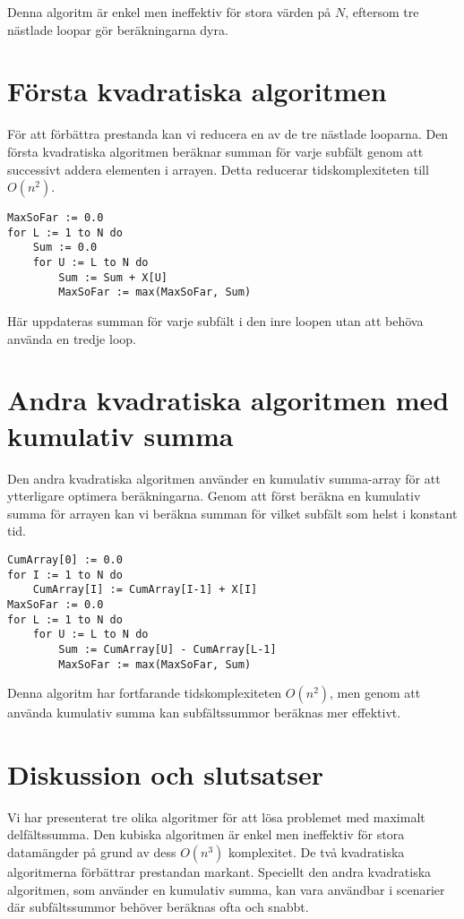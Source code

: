 \documentclass[a4paper,12pt]{article}
\begin{document}
Denna algoritm är enkel men ineffektiv för stora värden på $N$, eftersom tre nästlade loopar gör beräkningarna dyra.

\section{Första kvadratiska algoritmen}
\label{sec:kvadratisk1}

För att förbättra prestanda kan vi reducera en av de tre nästlade looparna. Den första kvadratiska algoritmen beräknar summan för varje subfält genom att successivt addera elementen i arrayen. Detta reducerar tidskomplexiteten till $O(n^2)$.

\begin{verbatim}
MaxSoFar := 0.0
for L := 1 to N do
    Sum := 0.0
    for U := L to N do
        Sum := Sum + X[U]
        MaxSoFar := max(MaxSoFar, Sum)
\end{verbatim}

Här uppdateras summan för varje subfält i den inre loopen utan att behöva använda en tredje loop.

\section{Andra kvadratiska algoritmen med kumulativ summa}
\label{sec:kvadratisk2}

Den andra kvadratiska algoritmen använder en kumulativ summa-array för att ytterligare optimera beräkningarna. Genom att först beräkna en kumulativ summa för arrayen kan vi beräkna summan för vilket subfält som helst i konstant tid.

\begin{verbatim}
CumArray[0] := 0.0
for I := 1 to N do
    CumArray[I] := CumArray[I-1] + X[I]
MaxSoFar := 0.0
for L := 1 to N do
    for U := L to N do
        Sum := CumArray[U] - CumArray[L-1]
        MaxSoFar := max(MaxSoFar, Sum)
\end{verbatim}

Denna algoritm har fortfarande tidskomplexiteten $O(n^2)$, men genom att använda kumulativ summa kan subfältssummor beräknas mer effektivt.

\section{Diskussion och slutsatser}
\label{sec:disk}

Vi har presenterat tre olika algoritmer för att lösa problemet med maximalt delfältssumma. Den kubiska algoritmen är enkel men ineffektiv för stora datamängder på grund av dess $O(n^3)$ komplexitet. De två kvadratiska algoritmerna förbättrar prestandan markant. Speciellt den andra kvadratiska algoritmen, som använder en kumulativ summa, kan vara användbar i scenarier där subfältssummor behöver beräknas ofta och snabbt.
\end{document}
